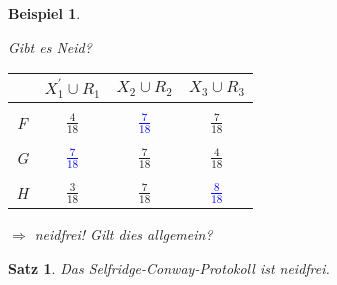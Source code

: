 \documentclass[a4paper,10pt]{scrartcl}
\newtheorem*{beispiel*}{Beispiel}
\newtheorem*{satz*}{Satz}
\begin{document}
\begin{beispiel*}
\begin{enumerate}
\begin{itemize}
                                        \end{itemize}
 \end{enumerate}
 Gibt es Neid?
 \begin{table}[h]
 \begin{tabular}{c|ccc}
  & $X_1^{'}\cup R_1$ & $X_2\cup R_2$ & $X_3\cup R_3$ \\ \hline\\
  F & $\frac{4}{18}$ & \textcolor{blue}{$\frac{7}{18}$} & $\frac{7}{18}$\\\\
  G & \textcolor{blue}{$\frac{7}{18}$} & $\frac{7}{18}$ & $\frac{4}{18}$\\\\
  H & $\frac{3}{18}$ & $\frac{7}{18}$ & \textcolor{blue}{$\frac{8}{18}$}\\
 \end{tabular}\end{table}

$\Rightarrow$ neidfrei! Gilt dies allgemein?
\end{beispiel*}
\begin{satz*}
 Das Selfridge-Conway-Protokoll ist neidfrei.
\end{satz*}
\end{document}
